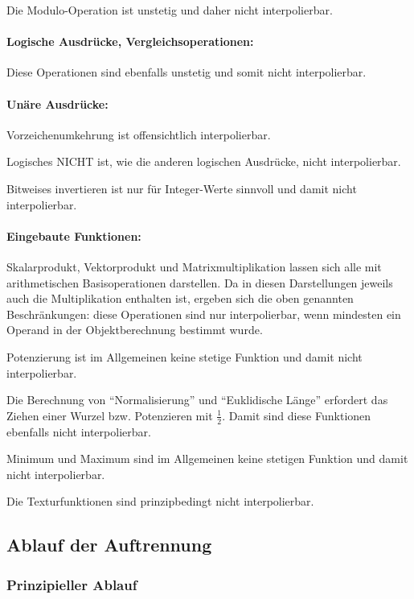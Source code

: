 \documentclass[twoside,a4paper,fleqn,12pt]{book}
\begin{document}
Die Modulo-Operation ist unstetig und daher nicht interpolierbar.

\paragraph{Logische Ausdrücke, Vergleichsoperationen:} Diese Operationen sind ebenfalls unstetig und somit nicht interpolierbar.

\paragraph{Unäre Ausdrücke:} Vorzeichenumkehrung ist offensichtlich interpolierbar.

Logisches NICHT ist, wie die anderen logischen Ausdrücke, nicht interpolierbar.

Bitweises invertieren ist nur für Integer-Werte sinnvoll und damit nicht interpolierbar.

\paragraph{Eingebaute Funktionen:} \label{split_builtins}
Skalarprodukt, Vektorprodukt und Matrixmultiplikation lassen sich alle mit arithmetischen Basisoperationen darstellen.
Da in diesen Darstellungen jeweils auch die Multiplikation enthalten ist, ergeben sich die oben genannten Beschränkungen:
diese Operationen sind nur interpolierbar, wenn mindesten ein Operand in der Objektberechnung bestimmt wurde.

Potenzierung ist im Allgemeinen keine stetige Funktion und damit nicht interpolierbar.

Die Berechnung von "`Normalisierung"' und "`Euklidische Länge"' erfordert das Ziehen einer Wurzel bzw. Potenzieren mit $\frac{1}{2}$.
Damit sind diese Funktionen ebenfalls nicht interpolierbar.

Minimum und Maximum sind im Allgemeinen keine stetigen Funktion und damit nicht interpolierbar.

Die Texturfunktionen sind prinzipbedingt nicht interpolierbar.

\subsection{Ablauf der Auftrennung}
\label{auftrennung_ablauf}

\subsubsection{Prinzipieller Ablauf}
\end{document}
